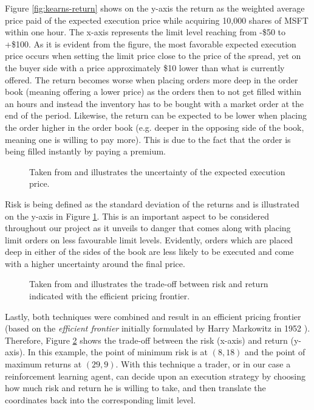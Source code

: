 Figure \ref{fig:kearns-return} shows on the y-axis the return as the weighted average price paid of the expected execution price while acquiring 10,000 shares of MSFT within one hour.
The x-axis represents the limit level reaching from -\$50 to +\$100.
As it is evident from the figure, the most favorable expected execution price occurs when setting the limit price close to the price of the spread, yet on the buyer side with a price approximately \$10 lower than what is currently offered.
The return becomes worse when placing orders more deep in the order book (meaning offering a lower price) as the orders then to not get filled within an hours and instead the inventory has to be bought with a market order at the end of the period.
Likewise, the return can be expected to be lower when placing the order higher in the order book (e.g. deeper in the opposing side of the book, meaning one is willing to pay more).
This is due to the fact that the order is being filled instantly by paying a premium.

\begin{figure}[H]
    \centering
    \caption{Taken from \cite{nevmyvaka2005electronic} and illustrates the uncertainty of the expected execution price.}
    \label{fig:kearns-std}
\end{figure}

Risk is being defined as the standard deviation of the returns and is illustrated on the y-axis in Figure \ref{fig:kearns-std}.
This is an important aspect to be considered throughout our project as it unveils to danger that comes along with placing limit orders on less favourable limit levels.
Evidently, orders which are placed deep in either of the sides of the book are less likely to be executed and come with a higher uncertainty around the final price.

\begin{figure}[H]
    \centering
    \caption{Taken from \cite{nevmyvaka2005electronic} and illustrates the trade-off between risk and return indicated with the efficient pricing frontier.}
    \label{fig:kearns-frontier}
\end{figure}

Lastly, both techniques were combined and result in an efficient pricing frontier (based on the \textit{efficient frontier} initially formulated by Harry Markowitz in 1952 \cite{markowitz1952portfolio}). 
Therefore, Figure \ref{fig:kearns-frontier} shows the trade-off between the risk (x-axis) and return (y-axis).
In this example, the point of minimum risk is at $(8, 18)$ and the point of maximum returns at $(29, 9)$.
With this technique a trader, or in our case a reinforcement learning agent, can decide upon an execution strategy by choosing how much risk and return he is willing to take, and then translate the coordinates back into the corresponding limit level.

